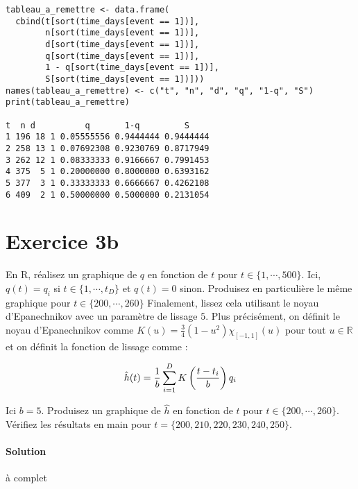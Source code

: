 \documentclass[../main.tex]{subfiles}
\begin{document}
\begin{CJK*}{UTF8}{gbsn}
\begin{lstlisting}
tableau_a_remettre <- data.frame(
  cbind(t[sort(time_days[event == 1])], 
        n[sort(time_days[event == 1])], 
        d[sort(time_days[event == 1])], 
        q[sort(time_days[event == 1])],
        1 - q[sort(time_days[event == 1])],
        S[sort(time_days[event == 1])]))
names(tableau_a_remettre) <- c("t", "n", "d", "q", "1-q", "S")
print(tableau_a_remettre)

t  n d          q       1-q         S
1 196 18 1 0.05555556 0.9444444 0.9444444
2 258 13 1 0.07692308 0.9230769 0.8717949
3 262 12 1 0.08333333 0.9166667 0.7991453
4 375  5 1 0.20000000 0.8000000 0.6393162
5 377  3 1 0.33333333 0.6666667 0.4262108
6 409  2 1 0.50000000 0.5000000 0.2131054

\end{lstlisting}

\section*{Exercice 3b}
En R, réalisez un graphique de $q$ en fonction de $t$ pour $t \in \{1, \cdots, 500\}$.
Ici, $q(t) = q_i$ si $t \in \{1, \cdots, t_D\}$ et $q(t) = 0$ sinon.
Produisez en particulière le même graphique pour $t \in \{200, \cdots, 260\}$
Finalement, lissez cela utilisant le noyau d'Epanechnikov avec un paramètre de lissage $5$.
Plus précisément, on définit le noyau d'Epanechnikov comme $K(u) = \frac{3}{4}(1-u^2)\chi_{[-1,1]}(u)$
pour tout $u \in \mathbb{R}$ et on définit la fonction de lissage comme :

\begin{equation*}
    \hat{h}(t) = \frac{1}{b} \sum_{i=1}^D K\left ( \frac{t-t_i}{b} \right ) q_i
\end{equation*}

Ici $b = 5$. 
Produisez un graphique de $\hat{h}$ en fonction de $t$ pour $t \in \{200, \cdots, 260\}$.
Vérifiez les résultats en main pour $t = \{200, 210, 220, 230, 240, 250\}$.

\paragraph{Solution}

à complet

\end{CJK*}
\end{document}
